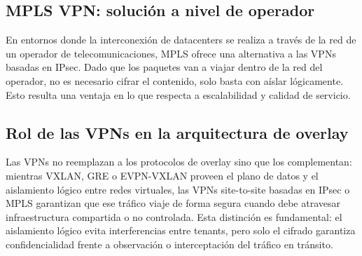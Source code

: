 \subsection{MPLS VPN: solución a nivel de operador}

En entornos donde la interconexión de datacenters se realiza a través de la red de un operador de telecomunicaciones, MPLS ofrece una alternativa a las VPNs basadas en IPsec. Dado que los paquetes van a viajar dentro de la red del operador, no es necesario cifrar el contenido, solo basta con aíslar lógicamente. Esto resulta una ventaja en lo que respecta a escalabilidad y calidad de servicio.

\subsection{Rol de las VPNs en la arquitectura de overlay}

Las VPNs no reemplazan a los protocolos de overlay sino que los complementan: mientras VXLAN, GRE o EVPN-VXLAN proveen el plano de datos y el aislamiento lógico entre redes virtuales, las VPNs site-to-site basadas en IPsec o MPLS garantizan que ese tráfico viaje de forma segura cuando debe atravesar infraestructura compartida o no controlada. Esta distinción es fundamental: el aislamiento lógico evita interferencias entre tenants, pero solo el cifrado garantiza confidencialidad frente a observación o interceptación del tráfico en tránsito.
